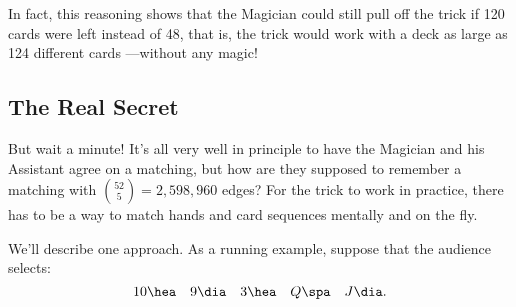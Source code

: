 In fact, this reasoning shows that the Magician could still pull off
the trick if 120 cards were left instead of 48, that is, the trick
would work with a deck as large as 124 different cards ---without any
magic!

\subsection{The Real Secret}

But wait a minute!  It's all very well in principle to have the Magician
and his Assistant agree on a matching, but how are they supposed to
remember a matching with $\binom{52}{5} = 2,598,960$ edges?  For the trick
to work in practice, there has to be a way to match hands and card
sequences mentally and on the fly.



We'll describe one approach.  As a running example, suppose that the
audience selects:
\[
10 \hea \quad 9 \dia \quad 3 \hea \quad Q \spa \quad J \dia.
\]

